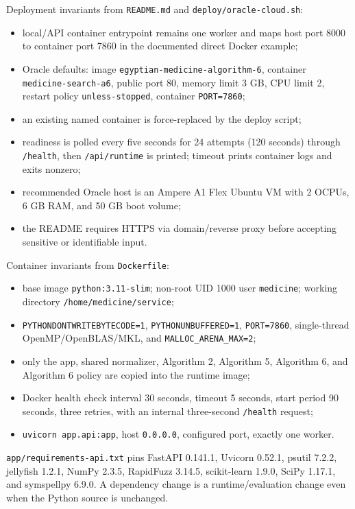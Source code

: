 Deployment invariants from \texttt{README.md} and \texttt{deploy/oracle-cloud.sh}:

\begin{itemize}
\tightlist
\item
  local/API container entrypoint remains one worker and maps host port 8000 to container port 7860 in the documented direct Docker example;
\item
  Oracle defaults: image \texttt{egyptian-medicine-algorithm-6}, container \texttt{medicine-search-a6}, public port 80, memory limit 3 GB, CPU limit 2, restart policy \texttt{unless-stopped}, container \texttt{PORT=7860};
\item
  an existing named container is force-replaced by the deploy script;
\item
  readiness is polled every five seconds for 24 attempts (120 seconds) through \texttt{/health}, then \texttt{/api/runtime} is printed; timeout prints container logs and exits nonzero;
\item
  recommended Oracle host is an Ampere A1 Flex Ubuntu VM with 2 OCPUs, 6 GB RAM, and 50 GB boot volume;
\item
  the README requires HTTPS via domain/reverse proxy before accepting sensitive or identifiable input.
\end{itemize}

Container invariants from \texttt{Dockerfile}:

\begin{itemize}
\tightlist
\item
  base image \texttt{python:3.11-slim}; non-root UID 1000 user \texttt{medicine}; working directory \texttt{/home/medicine/service};
\item
  \texttt{PYTHONDONTWRITEBYTECODE=1}, \texttt{PYTHONUNBUFFERED=1}, \texttt{PORT=7860}, single-thread OpenMP/OpenBLAS/MKL, and \texttt{MALLOC\_\allowbreak{}ARENA\_\allowbreak{}MAX=2};
\item
  only the app, shared normalizer, Algorithm 2, Algorithm 5, Algorithm 6, and Algorithm 6 policy are copied into the runtime image;
\item
  Docker health check interval 30 seconds, timeout 5 seconds, start period 90 seconds, three retries, with an internal three-second \texttt{/health} request;
\item
  \texttt{uvicorn\ app.api:app}, host \texttt{0.0.0.0}, configured port, exactly one worker.
\end{itemize}

\texttt{app/requirements-api.txt} pins FastAPI 0.141.1, Uvicorn 0.52.1, psutil 7.2.2, jellyfish 1.2.1, NumPy 2.3.5, RapidFuzz 3.14.5, scikit-learn 1.9.0, SciPy 1.17.1, and symspellpy 6.9.0. A dependency change is a runtime/evaluation change even when the Python source is unchanged.

